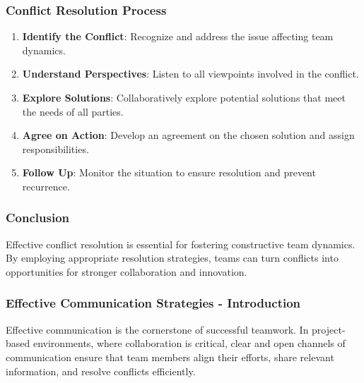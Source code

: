 \documentclass[aspectratio=169]{beamer}
\begin{document}
\begin{frame}[fragile]
    \frametitle{Conflict Resolution Process}
    \begin{enumerate}
        \item \textbf{Identify the Conflict}: Recognize and address the issue affecting team dynamics.
        \item \textbf{Understand Perspectives}: Listen to all viewpoints involved in the conflict.
        \item \textbf{Explore Solutions}: Collaboratively explore potential solutions that meet the needs of all parties.
        \item \textbf{Agree on Action}: Develop an agreement on the chosen solution and assign responsibilities.
        \item \textbf{Follow Up}: Monitor the situation to ensure resolution and prevent recurrence.
    \end{enumerate}
\end{frame}

\begin{frame}[fragile]
    \frametitle{Conclusion}
    Effective conflict resolution is essential for fostering constructive team dynamics. By employing appropriate resolution strategies, teams can turn conflicts into opportunities for stronger collaboration and innovation.
\end{frame}

\begin{frame}[fragile]
    \frametitle{Effective Communication Strategies - Introduction}
    Effective communication is the cornerstone of successful teamwork. In project-based environments, where collaboration is critical, clear and open channels of communication ensure that team members align their efforts, share relevant information, and resolve conflicts efficiently.
\end{frame}
\end{document}
